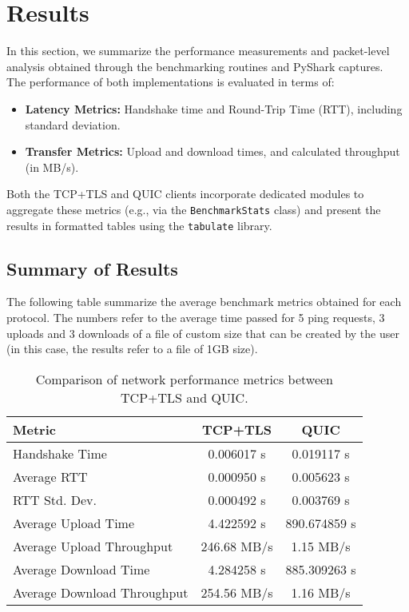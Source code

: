 \section{Results}
In this section, we summarize the performance measurements and packet-level analysis obtained through the benchmarking routines and PyShark captures. \\
The performance of both implementations is evaluated in terms of:

\begin{itemize}
    \item \textbf{Latency Metrics:} Handshake time and Round-Trip Time (RTT), including standard deviation.
    
    \item \textbf{Transfer Metrics:} Upload and download times, and calculated throughput (in MB/s).
\end{itemize}

Both the TCP+TLS and QUIC clients incorporate dedicated modules to aggregate these metrics (e.g., via the \texttt{BenchmarkStats} class) and present the results in formatted tables using the \texttt{tabulate} library.

\subsection{Summary of Results}
The following table summarize the average benchmark metrics obtained for each protocol. The numbers refer to the average time passed for 5 ping requests, 3 uploads and 3 downloads of a file of custom size that can be created by the user (in this case, the results refer to a file of 1GB size).

\begin{table}[h!]
\centering
\begin{tabular}{lcc}
\toprule
\textbf{Metric} & \textbf{TCP+TLS} & \textbf{QUIC} \\
\midrule
Handshake Time & 0.006017 s & 0.019117 s \\
Average RTT & 0.000950 s & 0.005623 s \\
RTT Std. Dev. & 0.000492 s & 0.003769 s \\
Average Upload Time & 4.422592 s & 890.674859 s \\
Average Upload Throughput & 246.68 MB/s & 1.15 MB/s \\
Average Download Time & 4.284258 s & 885.309263 s \\
Average Download Throughput & 254.56 MB/s & 1.16 MB/s \\
\bottomrule
\end{tabular}
\caption{Comparison of network performance metrics between TCP+TLS and QUIC.}
\end{table}

